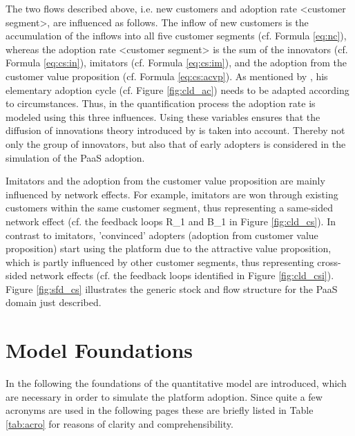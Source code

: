 The two flows described above, i.e. new customers and adoption rate <customer segment>, are influenced as follows. The inflow of new customers is the accumulation of the inflows into all five customer segments (cf. Formula \ref{eq:nc}), whereas the adoption rate <customer segment> is the sum of the innovators (cf. Formula \ref{eq:cs:in}), imitators (cf. Formula \ref{eq:cs:im}), and the adoption from the customer value proposition (cf. Formula \ref{eq:cs:acvp}). As mentioned by \citet[p. 20]{Sterman2001}, his elementary adoption cycle (cf. Figure \ref{fig:cld_ac}) needs to be adapted according to circumstances. Thus, in the quantification process the adoption rate is modeled using this three influences. Using these variables ensures that the diffusion of innovations theory introduced by \citet{Rogers2003} is taken into account. Thereby not only the group of innovators, but also that of early adopters is considered in the simulation of the \ac{PaaS} adoption.

Imitators and the adoption from the customer value proposition are mainly influenced by network effects. For example, imitators are won through existing customers within the same customer segment, thus representing a same-sided network effect (cf. the feedback loops R\_1 and B\_1 in Figure \ref{fig:cld_cs}). In contrast to imitators, 'convinced' adopters (adoption from customer value proposition) start using the platform due to the attractive value proposition, which is partly influenced by other customer segments, thus representing cross-sided network effects (cf. the feedback loops identified in Figure \ref{fig:cld_csi}). Figure \ref{fig:sfd_cs} illustrates the generic stock and flow structure for the \ac{PaaS} domain just described.

\section{Model Foundations}\label{ch:sfd:mf}
In the following the foundations of the quantitative model are introduced, which are necessary in order to simulate the platform adoption. Since quite a few acronyms are used in the following pages these are briefly listed in Table \ref{tab:acro} for reasons of clarity and comprehensibility.

